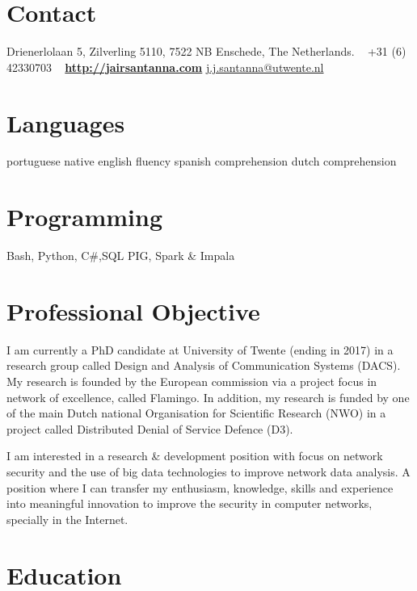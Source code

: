 \documentclass[]{friggeri-cv} %
\begin{document}

\begin{aside} %
\section{Contact}
Drienerlolaan 5,
Zilverling 5110,
7522 NB Enschede,
The Netherlands.
~
+31 (6) 42330703
~
\href{http://jairsantanna.com}{\textbf{http://jairsantanna.com}}
\href{mailto:j.j.santanna@utwente.nl}{j.j.santanna@utwente.nl}
\section{Languages}
portuguese native 
english fluency
spanish comprehension
dutch comprehension
\section{Programming}
Bash, Python, C\#,SQL
PIG, Spark \& Impala
\end{aside}

\section{Professional Objective}
I am currently a PhD candidate at University of Twente (ending in 2017) in a research group called Design and Analysis of Communication Systems (DACS). My research is founded by the European commission via a project focus in network of excellence, called Flamingo. In addition, my research is funded by one of the main Dutch national Organisation for Scientific Research (NWO) in a project called Distributed Denial of Service Defence (D3).

I am interested in a research \& development position with focus on network security and the use of big data technologies to improve network data analysis. A position where I can transfer my enthusiasm, knowledge, skills and experience into meaningful innovation to improve the security in computer networks, specially in the Internet. 

\section{Education}
\end{document}
